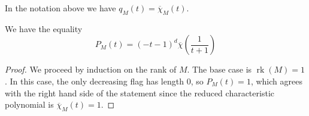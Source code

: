 \documentclass[10pt,a4paper]{amsart}
\DeclareMathOperator{\rank}{rk}
\begin{document}
\begin{lemma}\label{lem: formulaforqM}
In the notation above we have $q_M(t) = \overline{\chi}_M(t)$.
\end{lemma}

\begin{lemma}\label{lem: polynomialFormula}
We have the equality
\[
P_M(t) = (-t-1)^{d}\overline{\chi}\left(\frac{1}{t+1}\right)
\]
\end{lemma}

\begin{proof}
We proceed by induction on the rank of $M$. The base case is
$\rank(M) = 1$. In this case,
the only decreasing flag has length 0, so $P_M(t) = 1$, which agrees with the right hand side of the statement since the reduced characteristic polynomial is
$
\overline{\chi}_M(t) = 1
$.


\end{proof}
\end{document}

